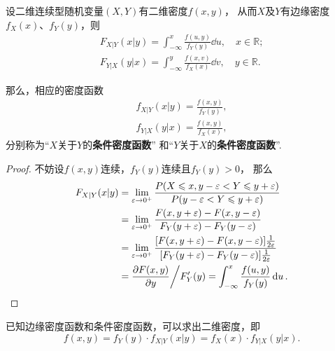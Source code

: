 \begin{theorem}
设二维连续型随机变量\((X,Y)\)有二维密度\(f(x,y)\)，%
从而\(X\)及\(Y\)有边缘密度\(f_X(x)\)、\(f_Y(y)\)，则
\begin{align*}
F_{X \vert Y}(x \vert y) = \int_{-\infty}^{x} \frac{f(u,y)}{f_Y(y)}\dd{u}, \quad x \in \mathbb{R}; \\
F_{Y \vert X}(y \vert x) = \int_{-\infty}^{y} \frac{f(x,v)}{f_X(x)}\dd{v}, \quad y \in \mathbb{R}.
\end{align*}

那么，相应的密度函数
\begin{gather}
f_{X \vert Y}(x \vert y) = \frac{f(x,y)}{f_Y(y)}, \label{equation:多维随机变量及其分布.条件密度、联合密度、边缘密度的关系1} \\
f_{Y \vert X}(y \vert x) = \frac{f(x,y)}{f_X(x)}, \label{equation:多维随机变量及其分布.条件密度、联合密度、边缘密度的关系2}
\end{gather}
分别称为“\(X\)关于\(Y\)的\textbf{条件密度函数}”%
和“\(Y\)关于\(X\)的\textbf{条件密度函数}”.
\begin{proof}
不妨设\(f(x,y)\)连续，\(f_Y(y)\)连续且\(f_Y(y)>0\)，%
\def\l{\lim\limits_{\varepsilon\to0^+}}%
那么\begin{align*}
F_{X \vert Y}(x \vert y)
&= \l \frac{P(X \leqslant x, y - \varepsilon < Y \leqslant y + \varepsilon)}{P(y - \varepsilon < Y \leqslant y + \varepsilon)} \\
&= \l \frac{F(x,y+\varepsilon) - F(x,y-\varepsilon)}{F_Y(y+\varepsilon) - F_Y(y-\varepsilon)} \\
&= \l \frac{[F(x,y+\varepsilon) - F(x,y-\varepsilon)] \frac{1}{2 \varepsilon}}{[F_Y(y+\varepsilon) - F_Y(y-\varepsilon)] \frac{1}{2 \varepsilon}} \\
&= \pdv{F(x,y)}{y} \bigg/ F_Y'(y)
= \int_{-\infty}^x \frac{f(u,y)}{f_Y(y)} \dd{u}.
\qedhere
\end{align*}
\end{proof}
\end{theorem}

\begin{corollary}
已知边缘密度函数和条件密度函数，可以求出二维密度，即\[
f(x,y) = f_Y(y) \cdot f_{X \vert Y}(x \vert y)
= f_X(x) \cdot f_{Y \vert X}(y \vert x).
\]
\end{corollary}

